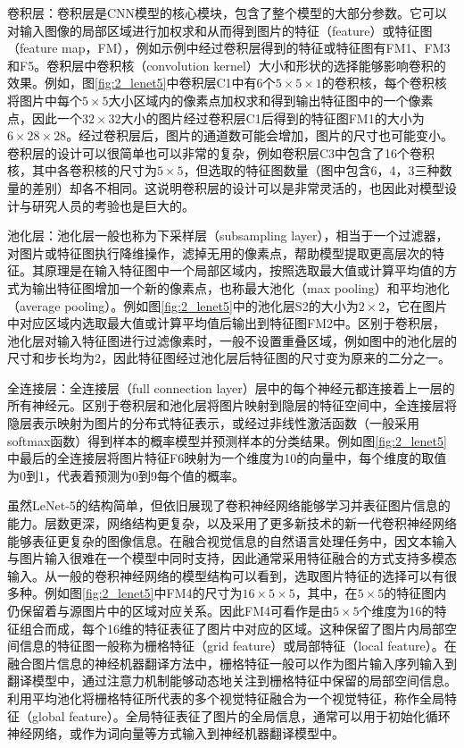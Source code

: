{\sffamily 卷积层：}卷积层是CNN模型的核心模块，包含了整个模型的大部分参数。它可以对输入图像的局部区域进行加权求和从而得到图片的特征（feature）或特征图（feature map，FM），例如示例中经过卷积层得到的特征或特征图有FM1、FM3和F5。卷积层中卷积核（convolution kernel）大小和形状的选择能够影响卷积的效果。例如，图\ref{fig:2_lenet5}中卷积层C1中有6个$5 \times 5 \times 1$的卷积核，每个卷积核将图片中每个$5 \times 5$大小区域内的像素点加权求和得到输出特征图中的一个像素点，因此一个$32 \times 32$大小的图片经过卷积层C1后得到的特征图FM1的大小为$6 \times 28 \times 28$。经过卷积层后，图片的通道数可能会增加，图片的尺寸也可能变小。卷积层的设计可以很简单也可以非常的复杂，例如卷积层C3中包含了16个卷积核，其中各卷积核的尺寸为$5 \times 5$，但选取的特征图数量（图中包含6，4，3三种数量的差别）却各不相同。这说明卷积层的设计可以是非常灵活的，也因此对模型设计与研究人员的考验也是巨大的。

{\sffamily 池化层：}池化层一般也称为下采样层（subsampling layer），相当于一个过滤器，对图片或特征图执行降维操作，滤掉无用的像素点，帮助模型提取更高层次的特征。其原理是在输入特征图中一个局部区域内，按照选取最大值或计算平均值的方式为输出特征图增加一个新的像素点，也称最大池化（max pooling）和平均池化（average pooling）。例如图\ref{fig:2_lenet5}中的池化层S2的大小为$2 \times 2$，它在图片中对应区域内选取最大值或计算平均值后输出到特征图FM2中。区别于卷积层，池化层对输入特征图进行过滤像素时，一般不设置重叠区域，例如图中的池化层的尺寸和步长均为2，因此特征图经过池化层后特征图的尺寸变为原来的二分之一。

{\sffamily 全连接层：}全连接层（full connection layer）层中的每个神经元都连接着上一层的所有神经元。区别于卷积层和池化层将图片映射到隐层的特征空间中，全连接层将隐层表示映射为图片的分布式特征表示，或经过非线性激活函数（一般采用softmax函数）得到样本的概率模型并预测样本的分类结果。例如图\ref{fig:2_lenet5}中最后的全连接层将图片特征F6映射为一个维度为10的向量中，每个维度的取值为0到1，代表着预测为0到9每个值的概率。

虽然LeNet-5的结构简单，但依旧展现了卷积神经网络能够学习并表征图片信息的能力。层数更深，网络结构更复杂，以及采用了更多新技术的新一代卷积神经网络能够表征更复杂的图像信息。在融合视觉信息的自然语言处理任务中，因文本输入与图片输入很难在一个模型中同时支持，因此通常采用特征融合的方式支持多模态输入。从一般的卷积神经网络的模型结构可以看到，选取图片特征的选择可以有很多种。例如图\ref{fig:2_lenet5}中FM4的尺寸为$16 \times 5 \times 5$，其中，在$5 \times 5$的特征图内仍保留着与源图片中的区域对应关系。因此FM4可看作是由$5 \times 5$个维度为16的特征组合而成，每个16维的特征表征了图片中对应的区域。这种保留了图片内局部空间信息的特征图一般称为栅格特征（grid feature）或局部特征（local feature）。在融合图片信息的神经机器翻译方法中，栅格特征一般可以作为图片输入序列输入到翻译模型中，通过注意力机制能够动态地关注到栅格特征中保留的局部空间信息。利用平均池化将栅格特征所代表的多个视觉特征融合为一个视觉特征，称作全局特征（global feature）。全局特征表征了图片的全局信息，通常可以用于初始化循环神经网络，或作为词向量等方式输入到神经机器翻译模型中。

